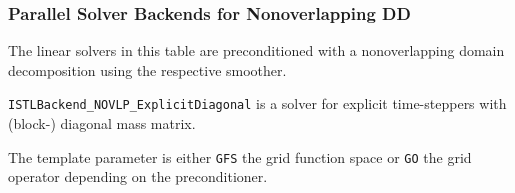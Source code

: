 \begin{frame}
  \frametitle{Parallel Solver Backends for Nonoverlapping DD}
The linear solvers in this table are preconditioned with a nonoverlapping domain decomposition
using the respective smoother.\medskip

\medskip

\lstinline!ISTLBackend_NOVLP_ExplicitDiagonal! is a solver for explicit
time-steppers with (block-) diagonal mass matrix.

The template parameter is either \lstinline!GFS! the grid function space or \lstinline!GO! the grid operator depending on the preconditioner.
\end{frame}

